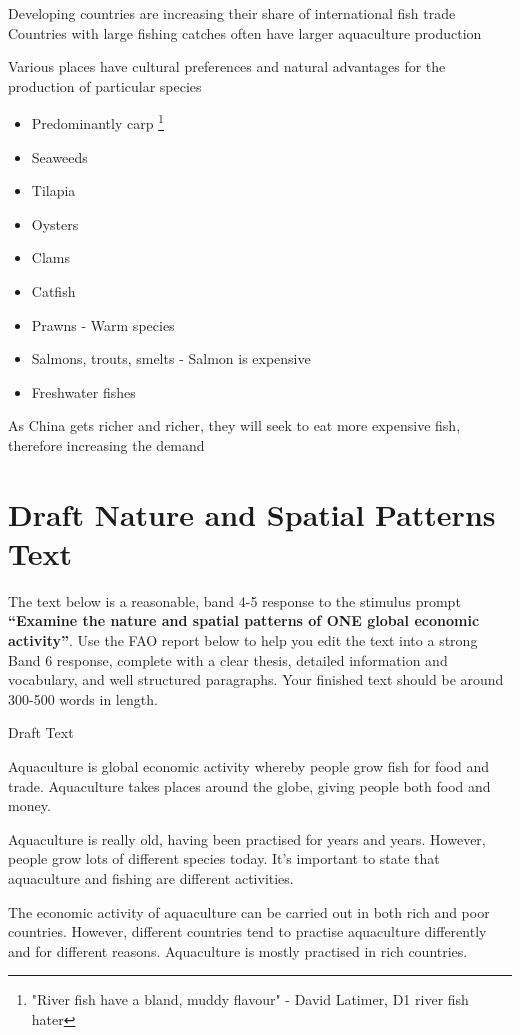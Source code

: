 		Developing countries are increasing their share of international fish trade
		Countries with large fishing catches often have larger aquaculture production
		
		Various places have cultural preferences and natural advantages for the production of particular species
		\begin{itemize}
			\item Predominantly carp \footnote{"River fish have a bland, muddy flavour" - David Latimer, D1 river fish hater}
			\item Seaweeds
			\item Tilapia
			\item Oysters
			\item Clams
			\item Catfish
			\item Prawns - Warm species
			\item Salmons, trouts, smelts - Salmon is expensive
			\item Freshwater fishes
		\end{itemize}

		As China gets richer and richer, they will seek to eat more expensive fish, therefore increasing the demand

\section{Draft Nature and Spatial Patterns Text} \label{4/11/2024 - 6/11/2024}
The text below is a reasonable, band 4-5 response to the stimulus prompt \textbf{“Examine the nature and spatial patterns of ONE global economic activity”}. Use the FAO report below to help you edit the text into a strong Band 6 response, complete with a clear thesis, detailed information and vocabulary, and well structured paragraphs.  Your finished text should be around 300-500 words in length. 

{\large Draft Text}

Aquaculture is global economic activity whereby people grow fish for food and trade. Aquaculture takes places around the globe, giving people both food and money. 

Aquaculture is really old, having been practised for years and years. However, people grow lots of different species today. It's important to state that aquaculture and fishing are different activities.

The economic activity of aquaculture can be carried out in both rich and poor countries. However, different countries tend to practise aquaculture differently and for different reasons. Aquaculture is mostly practised in rich countries. 

